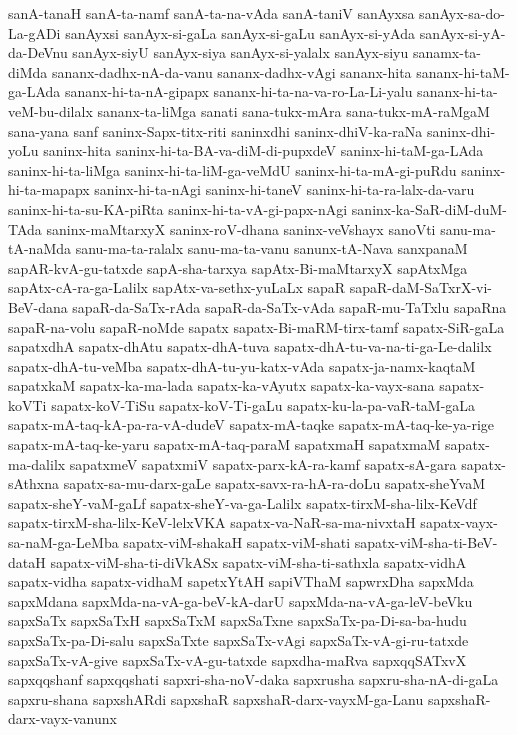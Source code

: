 {sanA-tanaH
sanA-ta-namf
sanA-ta-na-vAda
sanA-taniV
sanAyxsa
sanAyx-sa-do-La-gADi
sanAyxsi
sanAyx-si-gaLa
sanAyx-si-gaLu
sanAyx-si-yAda
sanAyx-si-yA-da-DeVnu
sanAyx-siyU
sanAyx-siya
sanAyx-si-yalalx
sanAyx-siyu
sanamx-ta-diMda
sananx-dadhx-nA-da-vanu
sananx-dadhx-vAgi
sananx-hita
sananx-hi-taM-ga-LAda
sananx-hi-ta-nA-gipapx
sananx-hi-ta-na-va-ro-La-Li-yalu
sananx-hi-ta-veM-bu-dilalx
sananx-ta-liMga
sanati
sana-tukx-mAra
sana-tukx-mA-raMgaM
sana-yana
sanf
saninx-Sapx-titx-riti
saninxdhi
saninx-dhiV-ka-raNa
saninx-dhi-yoLu
saninx-hita
saninx-hi-ta-BA-va-diM-di-pupxdeV
saninx-hi-taM-ga-LAda
saninx-hi-ta-liMga
saninx-hi-ta-liM-ga-veMdU
saninx-hi-ta-mA-gi-puRdu
saninx-hi-ta-mapapx
saninx-hi-ta-nAgi
saninx-hi-taneV
saninx-hi-ta-ra-lalx-da-varu
saninx-hi-ta-su-KA-piRta
saninx-hi-ta-vA-gi-papx-nAgi
saninx-ka-SaR-diM-duM-TAda
saninx-maMtarxyX
saninx-roV-dhana
saninx-veVshayx
sanoVti
sanu-ma-tA-naMda
sanu-ma-ta-ralalx
sanu-ma-ta-vanu
sanunx-tA-Nava
sanxpanaM
sapAR-kvA-gu-tatxde
sapA-sha-tarxya
sapAtx-Bi-maMtarxyX
sapAtxMga
sapAtx-cA-ra-ga-Lalilx
sapAtx-va-sethx-yuLaLx
sapaR
sapaR-daM-SaTxrX-vi-BeV-dana
sapaR-da-SaTx-rAda
sapaR-da-SaTx-vAda
sapaR-mu-TaTxlu
sapaRna
sapaR-na-volu
sapaR-noMde
sapatx
sapatx-Bi-maRM-tirx-tamf
sapatx-SiR-gaLa
sapatxdhA
sapatx-dhAtu
sapatx-dhA-tuva
sapatx-dhA-tu-va-na-ti-ga-Le-dalilx
sapatx-dhA-tu-veMba
sapatx-dhA-tu-yu-katx-vAda
sapatx-ja-namx-kaqtaM
sapatxkaM
sapatx-ka-ma-lada
sapatx-ka-vAyutx
sapatx-ka-vayx-sana
sapatx-koVTi
sapatx-koV-TiSu
sapatx-koV-Ti-gaLu
sapatx-ku-la-pa-vaR-taM-gaLa
sapatx-mA-taq-kA-pa-ra-vA-dudeV
sapatx-mA-taqke
sapatx-mA-taq-ke-ya-rige
sapatx-mA-taq-ke-yaru
sapatx-mA-taq-paraM
sapatxmaH
sapatxmaM
sapatx-ma-dalilx
sapatxmeV
sapatxmiV
sapatx-parx-kA-ra-kamf
sapatx-sA-gara
sapatx-sAthxna
sapatx-sa-mu-darx-gaLe
sapatx-savx-ra-hA-ra-doLu
sapatx-sheYvaM
sapatx-sheY-vaM-gaLf
sapatx-sheY-va-ga-Lalilx
sapatx-tirxM-sha-lilx-KeVdf
sapatx-tirxM-sha-lilx-KeV-lelxVKA
sapatx-va-NaR-sa-ma-nivxtaH
sapatx-vayx-sa-naM-ga-LeMba
sapatx-viM-shakaH
sapatx-viM-shati
sapatx-viM-sha-ti-BeV-dataH
sapatx-viM-sha-ti-diVkASx
sapatx-viM-sha-ti-sathxla
sapatx-vidhA
sapatx-vidha
sapatx-vidhaM
sapetxYtAH
sapiVThaM
sapwrxDha
sapxMda
sapxMdana
sapxMda-na-vA-ga-beV-kA-darU
sapxMda-na-vA-ga-leV-beVku
sapxSaTx
sapxSaTxH
sapxSaTxM
sapxSaTxne
sapxSaTx-pa-Di-sa-ba-hudu
sapxSaTx-pa-Di-salu
sapxSaTxte
sapxSaTx-vAgi
sapxSaTx-vA-gi-ru-tatxde
sapxSaTx-vA-give
sapxSaTx-vA-gu-tatxde
sapxdha-maRva
sapxqqSATxvX
sapxqqshanf
sapxqqshati
sapxri-sha-noV-daka
sapxrusha
sapxru-sha-nA-di-gaLa
sapxru-shana
sapxshARdi
sapxshaR
sapxshaR-darx-vayxM-ga-Lanu
sapxshaR-darx-vayx-vanunx
}
